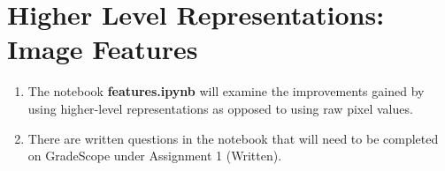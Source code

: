 \section{Higher Level Representations: Image Features}

\begin{enumerate}
    \item {} The notebook \textbf{features.ipynb} will examine the improvements gained by using higher-level representations as opposed to using raw pixel values.  
    \item {} There are written questions in the notebook that will need to be completed on GradeScope under Assignment 1 (Written).
\end{enumerate}